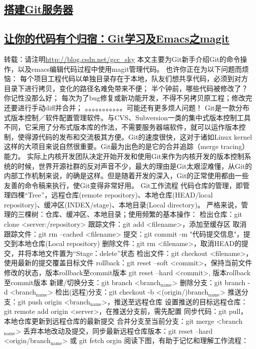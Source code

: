 \documentclass[11pt]{ctexart}
\begin{document}
\subsection{\href{https://www.liaoxuefeng.com/wiki/0013739516305929606dd18361248578c67b8067c8c017b000/00137583770360579bc4b458f044ce7afed3df579123eca000}{搭建Git服务器}}
\label{sec:orgf39b787}
\subsection{\href{http://blog.csdn.net/gcc\_sky/article/details/14047687}{让你的代码有个归宿：Git学习及Emacs之magit}}
\label{sec:orgbe26421}

转载：请注明\url{http://blog.csdn.net/gcc\_sky}
本文主要为Git新手介绍Git的命令操作，以及emacs编辑代码过程中使用magit管理代码。
也许你正在为以下问题而烦恼：
每个项目工程代码以单独目录存在于本地，队友们想共享代码，必须到对方目录下进行拷贝，变化的路径名难免带来不便；
半个钟前，哪些代码被修改了？你记性没那么好；
每次为了bug修复或新功能开发，不得不另拷贝原工程；修改完还要进行手动diff并合并；
。。。。。。。。。。。可能还有更多烦人问题！
Git是一款分布式版本控制／软件配置管理软件。与CVS、Subversion一类的集中式版本控制工具不同，它采用了分布式版本库的作法，不需要服务器端软件，就可以运作版本控制，使得源代码的发布和交流极其方便。Git的速度很快，这对于诸如Linux kernel这样的大项目来说自然很重要。Git最为出色的是它的合并追踪（merge tracing）能力。
实际上内核开发团队决定开始开发和使用Git来作为内核开发的版本控制系统的时候，世界开源社群的反对声音不少，最大的理由是Git太艰涩难懂，从Git的内部工作机制来说，的确是这样。但是随着开发的深入，Git的正常使用都由一些友善的命令稿来执行，使Git变得非常好用。
Git工作流程
代码仓库的管理，即管理四棵“Tree”，远程仓库(remote repository)、本地仓库(HEAD/local repository)、缓冲区(INDEX/stage)、本地目录(Local directory)。
严格来说，管理的三棵树：仓库、缓冲区、本地目录；使用频繁的基本操作：
检出仓库：git clone <server:/repository>
跟踪文件：git add <filename>，添加至缓存区
取消跟踪文件：git rm --cached <filename>
提交：git commit -m "代码提交信息"，提交到本地仓库(Local repository)
删除文件：git rm <filename>，取消HEAD的提交，并将本地文件置为“Stage：delete”状态
检出文件：git checkout <filename>，使用最新的提交覆盖目标文件
rollback：git reset --soft <commit>，保持当前文件修改的状态，版本rollback至commit版本
                git reset --hard <commit>, 版本rollback至commit版本
新建/切换分支：git branch <branch\(_{\text{name}}\)>
删除分支：git branch -d <branch\(_{\text{name}}\)>
检出(远程)分支：git checkout -b <(origin/)branch\(_{\text{name}}\)>
推送分支：git push origin <branch\(_{\text{name}}\)>，推送至远程仓库
设置推送的目标远程仓库：git remote add origin <server>，在推送分支前，需先配置
同步代码：git pull，本地仓库更新到远程仓库的最新提交
合并分支至当前分支：git merge <branch\(_{\text{name}}\)>
丢弃本地改动及提交，同步最新远程仓库版本：git reset --hard <origin/branch\(_{\text{name}}\)> 或 git fetch orgin
阅读下图，有助于记忆和理解工作流程：
\end{document}
